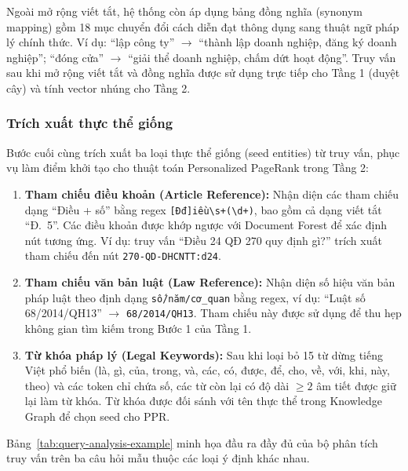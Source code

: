 Ngoài mở rộng viết tắt, hệ thống còn áp dụng bảng đồng nghĩa (synonym mapping) gồm
18 mục chuyển đổi cách diễn đạt thông dụng sang thuật ngữ pháp lý chính thức. Ví dụ:
``lập công ty'' $\to$ ``thành lập doanh nghiệp, đăng ký doanh nghiệp''; ``đóng cửa''
$\to$ ``giải thể doanh nghiệp, chấm dứt hoạt động''. Truy vấn sau khi mở rộng viết
tắt và đồng nghĩa được sử dụng trực tiếp cho Tầng 1 (duyệt cây) và tính vector nhúng
cho Tầng 2.

\subsubsection{Trích xuất thực thể giống}
\label{subsec:trich-xuat-thuc-the}

Bước cuối cùng trích xuất ba loại thực thể giống (seed entities) từ truy vấn, phục vụ
làm điểm khởi tạo cho thuật toán Personalized PageRank trong Tầng 2:

\begin{enumerate}
  \item \textbf{Tham chiếu điều khoản (Article Reference):} Nhận diện các tham chiếu
        dạng ``Điều + số'' bằng regex \texttt{[Đđ]iều\textbackslash s+(\textbackslash d+)},
        bao gồm cả dạng viết tắt ``Đ.~5''. Các điều khoản được khớp ngược với
        Document Forest để xác định nút tương ứng. Ví dụ: truy vấn ``Điều 24 QĐ 270
        quy định gì?'' trích xuất tham chiếu đến nút \texttt{270-QD-DHCNTT:d24}.

  \item \textbf{Tham chiếu văn bản luật (Law Reference):} Nhận diện số hiệu văn bản
        pháp luật theo định dạng \texttt{số/năm/cơ\_quan} bằng regex, ví dụ:
        ``Luật số 68/2014/QH13'' $\to$ \texttt{68/2014/QH13}. Tham chiếu này được
        sử dụng để thu hẹp không gian tìm kiếm trong Bước 1 của Tầng 1.

  \item \textbf{Từ khóa pháp lý (Legal Keywords):} Sau khi loại bỏ 15 từ dừng tiếng
        Việt phổ biến (là, gì, của, trong, và, các, có, được, để, cho, về, với, khi,
        này, theo) và các token chỉ chứa số, các từ còn lại có độ dài $\geq 2$ âm
        tiết được giữ lại làm từ khóa. Từ khóa được đối sánh với tên thực thể trong
        Knowledge Graph để chọn seed cho PPR.
\end{enumerate}

Bảng~\ref{tab:query-analysis-example} minh họa đầu ra đầy đủ của bộ phân tích truy
vấn trên ba câu hỏi mẫu thuộc các loại ý định khác nhau.

